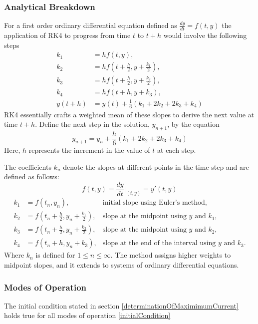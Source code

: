 \subsubsection{Analytical Breakdown}
For a first order ordinary differential equation defined as $\frac{dy}{dt} = f(t, y)$ the application of RK4 to progress from time $t$ to $t + h$ would involve the following steps
\begin{equation}
\begin{aligned}
k_1 &= hf(t, y), \\
k_2 &= hf(t + \frac{h}{2}, y + \frac{k_1}{2}), \\
k_3 &= hf(t + \frac{h}{2}, y + \frac{k_2}{2}), \\
k_4 &= hf(t + h, y + k_3), \\
y(t + h) &= y(t) + \frac{1}{6}(k_1 + 2k_2 + 2k_3 + k_4)
\end{aligned}
\end{equation}
RK4 essentially crafts a weighted mean of these slopes to derive the next value at time $t + h$. Define the next step in the solution, $y_{n+1}$, by the equation
\begin{equation}
y_{n+1} = y_n + \frac{h}{6} (k_1 + 2k_2 + 2k_3 + k_4)
\end{equation}
Here, $h$ represents the increment in the value of $t$ at each step.

The coefficients $k_n$ denote the slopes at different points in the time step and are defined as follows:
\begin{equation}
f(t, y) = \frac{dy}{dt}\bigg|_{(t, y)} = y'(t, y)
\end{equation}
\begin{align*}
k_1 &= f(t_n, y_n), &\text{initial slope using Euler's method},\\
k_2 &= f \left(t_n + \frac{h}{2}, y_n + \frac{k_1}{2}\right), &\text{slope at the midpoint using $y$ and $k_1$},\\
k_3 &= f \left(t_n + \frac{h}{2}, y_n + \frac{k_2}{2}\right), &\text{slope at the midpoint using $y$ and $k_2$},\\
k_4 &= f(t_n + h, y_n + k_3), &\text{slope at the end of the interval using $y$ and $k_3$}.
\end{align*}
Where $k_n$ is defined for $1 \leq n \leq \infty$. The method assigns higher weights to midpoint slopes, and it extends to systems of ordinary differential equations. 

\subsubsection{Modes of Operation}
The initial condition stated in section \ref{determinationOfMaximimumCurrent} holds true for all modes of operation \eqref{initialCondition} 

